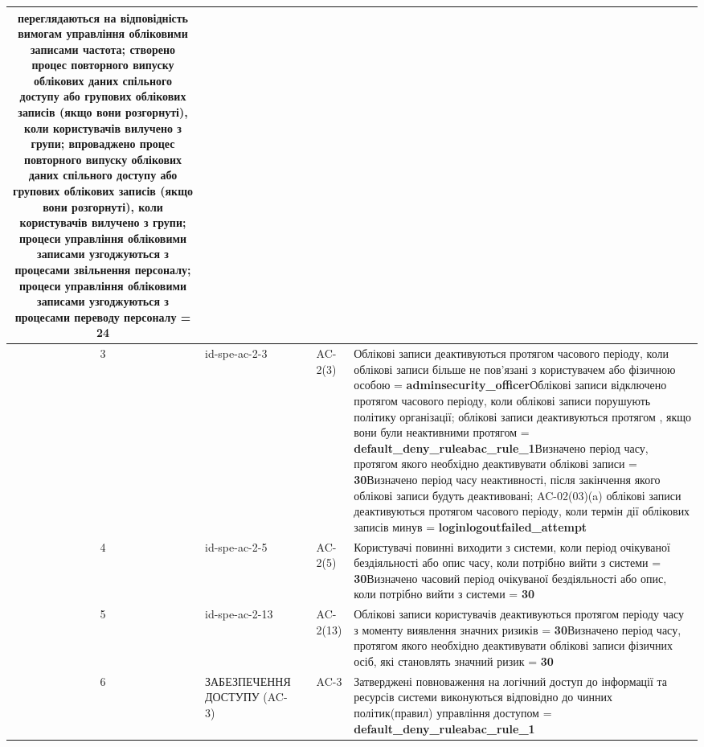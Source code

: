 \documentclass[10pt]{article}
\begin{document}
\begin{longtable}{|c|>{\raggedright\arraybackslash}p{2.5cm}|>{\raggedright\arraybackslash}p{4.5cm}|>{\raggedright\arraybackslash}p{3cm}|>{\raggedright\arraybackslash}p{4.5cm}|}
переглядаються на відповідність вимогам управління обліковими записами частота; створено процес повторного випуску облікових даних спільного доступу або групових облікових записів (якщо вони розгорнуті), коли користувачів вилучено з групи; впроваджено процес повторного випуску облікових даних спільного доступу або групових облікових записів (якщо вони розгорнуті), коли користувачів вилучено з групи; процеси управління обліковими записами узгоджуються з процесами звільнення персоналу; процеси управління обліковими записами узгоджуються з процесами переводу персоналу = \textbf{24} \\ \hline
3 & id-spe-ac-2-3 &  & AC-2(3) & Облікові записи деактивуються протягом часового періоду, коли облікові записи більше не пов'язані з користувачем або фізичною особою = \textbf{adminsecurity\_\allowbreak{}officer}\newline Облікові записи відключено протягом часового періоду, коли облікові записи порушують політику організації; облікові записи деактивуються протягом , якщо вони були неактивними протягом  = \textbf{default\_\allowbreak{}deny\_\allowbreak{}ruleabac\_\allowbreak{}rule\_\allowbreak{}1}\newline Визначено період часу, протягом якого необхідно деактивувати облікові записи = \textbf{30}\newline Визначено період часу неактивності, після закінчення якого облікові записи будуть деактивовані; AC-02(03)(a) облікові записи деактивуються протягом часового періоду, коли термін дії облікових записів минув = \textbf{loginlogoutfailed\_\allowbreak{}attempt} \\ \hline
4 & id-spe-ac-2-5 &  & AC-2(5) & Користувачі повинні виходити з системи, коли період очікуваної бездіяльності або опис часу, коли потрібно вийти з системи = \textbf{30}\newline Визначено часовий період очікуваної бездіяльності або опис, коли потрібно вийти з системи = \textbf{30} \\ \hline
5 & id-spe-ac-2-13 &  & AC-2(13) & Облікові записи користувачів деактивуються протягом періоду часу з моменту виявлення значних ризиків = \textbf{30}\newline Визначено період часу, протягом якого необхідно деактивувати облікові записи фізичних осіб, які становлять значний ризик = \textbf{30} \\ \hline
6 & ЗАБЕЗПЕЧЕННЯ ДОСТУПУ (AC-3) &  & AC-3 & Затверджені повноваження на логічний доступ до інформації та ресурсів системи виконуються відповідно до чинних політик(правил) управління доступом = \textbf{default\_\allowbreak{}deny\_\allowbreak{}ruleabac\_\allowbreak{}rule\_\allowbreak{}1} \\ \hline

\end{longtable}
\end{document}
